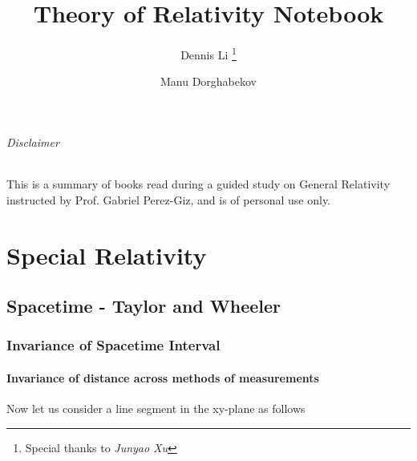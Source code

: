 \documentclass[11pt,letterpaper]{book}
\title{\textbf{Theory of Relativity Notebook}}
\author[$\dagger$]{
Dennis Li 
\thanks{Special thanks to \textit{Junyao Xu}}
}
\author[$\dagger$]{
Manu Dorghabekov 
}
\affil[$\dagger$]{Prof. Gabriel Perez-Giz}
\begin{document}
\maketitle

\paragraph{Disclaimer} This is a summary of books read during a guided study on General Relativity instructed by Prof. Gabriel Perez-Giz, and is of personal use only. 

\tableofcontents
\part{Special Relativity}
\chapter{Spacetime - Taylor and Wheeler}
\section{Invariance of Spacetime Interval}

\subsection{Invariance of distance across methods of measurements}

Now let us consider a line segment in the xy-plane as follows
\begin{center}
\end{center}
\end{document}
